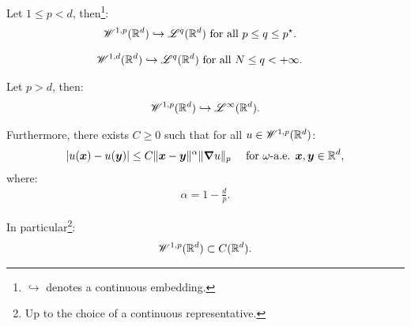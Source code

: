 \begin{corollary}
    Let $1 \leq p < d$, then\footnote{$\hookrightarrow$ denotes a continuous embedding.}:
    \begin{align}
        \mathscr{W}^{1, p}(\mathbb{R}^{d}) \hookrightarrow \mathscr{L}^{q}(\mathbb{R}^{d}) &\text{ for all } p \leq q \leq p^{\star}.
    \end{align}
\end{corollary}

\begin{corollary}
    \begin{align}
        \mathscr{W}^{1, d}(\mathbb{R}^{d}) \hookrightarrow \mathscr{L}^{q}(\mathbb{R}^{d}) &\text{ for all } N \leq q < +\infty.
    \end{align}
\end{corollary}

\begin{theorem}
    Let $p > d$, then:
    \begin{align}
        \mathscr{W}^{1, p}(\mathbb{R}^{d}) \hookrightarrow \mathscr{L}^{\infty}(\mathbb{R}^{d}).
    \end{align}

    Furthermore, there exists $C \geq 0$ such that for all $u \in \mathscr{W}^{1, p}(\mathbb{R}^{d})$:
    \begin{align}
        \lvert u(\bm{x}) - u(\bm{y}) \rvert &\leq C \lVert \bm{x} - \bm{y} \rVert^{\alpha} \lVert \bm{\nabla} u \rVert_p &\text{ for } \omega \text{-a.e. } \bm{x}, \bm{y} \in \mathbb{R}^{d},
    \end{align}
    where:
    \begin{align}
        \alpha = 1 - \frac{d}{p}.
    \end{align}

    In particular\footnote{Up to the choice of a continuous representative.}:
    \begin{align}
        \mathscr{W}^{1, p}(\mathbb{R}^{d}) \subset C(\mathbb{R}^{d}).
    \end{align}
\end{theorem}

